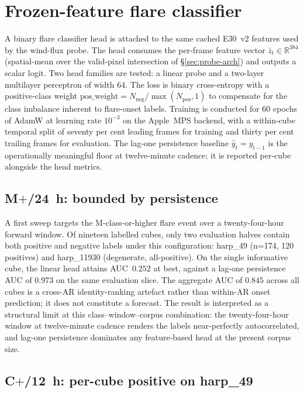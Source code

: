 \section{Frozen-feature flare classifier}
\label{sec:probe-flare}

A binary flare classifier head is attached to the same cached
E30~v2 features used by the wind-flux probe. The head consumes
the per-frame feature vector $\bar{z}_{t} \in \mathbb{R}^{384}$
(spatial-mean over the valid-pixel intersection of
\S\ref{sec:probe-arch}) and outputs a scalar logit. Two head
families are tested: a linear probe and a two-layer multilayer
perceptron of width 64. The loss is binary cross-entropy with a
positive-class weight $\mathrm{pos\_weight} = N_{\text{neg}} /
\max(N_{\text{pos}}, 1)$ to compensate for the class imbalance
inherent to flare-onset labels. Training is conducted for 60
epochs of AdamW at learning rate $10^{-3}$ on the Apple~MPS
backend, with a within-cube temporal split of seventy per cent
leading frames for training and thirty per cent trailing frames
for evaluation. The lag-one persistence baseline
$\hat{y}_{t} = y_{t-1}$ is the operationally meaningful floor at
twelve-minute cadence; it is reported per-cube alongside the head
metrics.

\subsection{\texorpdfstring{M$+$/24~h}{M+/24h}: bounded by persistence}
\label{sec:probe-flare-m24}

A first sweep targets the M-class-or-higher flare event over a
twenty-four-hour forward window. Of nineteen labelled cubes, only
two evaluation halves contain both positive and negative labels
under this configuration: harp\_49 (n=174, 120 positives) and
harp\_11930 (degenerate, all-positive). On the single informative
cube, the linear head attains AUC~$0.252$ at best, against a
lag-one persistence AUC of $0.973$ on the same evaluation slice. The aggregate AUC of $0.845$
across all cubes is a cross-AR identity-ranking artefact rather
than within-AR onset prediction; it does not constitute a
forecast. The result is interpreted as a structural limit at this
class--window--corpus combination: the twenty-four-hour window at
twelve-minute cadence renders the labels near-perfectly
autocorrelated, and lag-one persistence dominates any feature-based
head at the present corpus size.

\subsection{\texorpdfstring{C$+$/12~h}{C+/12h}: per-cube positive on harp\_49}
\label{sec:probe-flare-c12}


